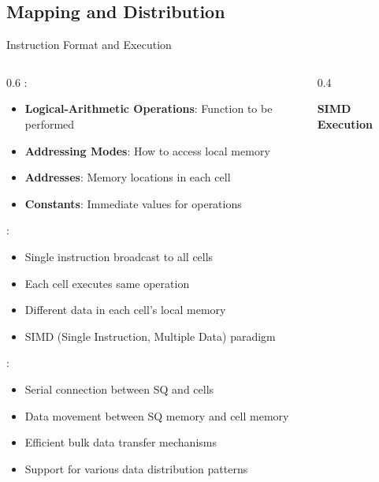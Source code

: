 \subsection{Mapping and Distribution}

\begin{frame}{Instruction Format and Execution}
\begin{columns}
\begin{column}{0.6\textwidth}
:
\begin{itemize}
\item \textbf{Logical-Arithmetic Operations}: Function to be performed
\item \textbf{Addressing Modes}: How to access local memory
\item \textbf{Addresses}: Memory locations in each cell
\item \textbf{Constants}: Immediate values for operations
\end{itemize}

\vspace{0.3cm}
:
\begin{itemize}
\item Single instruction broadcast to all cells
\item Each cell executes same operation
\item Different data in each cell's local memory
\item SIMD (Single Instruction, Multiple Data) paradigm
\end{itemize}

\vspace{0.3cm}
:
\begin{itemize}
\item Serial connection between SQ and cells
\item Data movement between SQ memory and cell memory
\item Efficient bulk data transfer mechanisms
\item Support for various data distribution patterns
\end{itemize}
\end{column}
\begin{column}{0.4\textwidth}
\begin{center}
\textbf{SIMD Execution}
\vspace{0.3cm}

\end{center}
\end{column}
\end{columns}
\end{frame}
